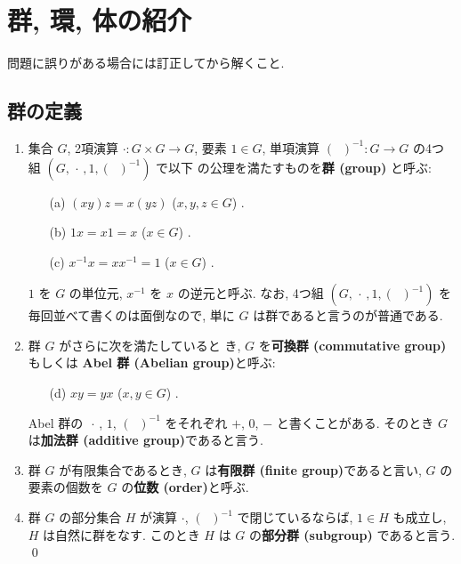 \documentclass[12pt,twoside]{jarticle}
\begin{document}

\section{群, 環, 体の紹介}

問題に誤りがある場合には訂正してから解くこと.


\subsection{群の定義}
\label{ss:group-def}

\begin{definition}[群]
\quad
\begin{enumerate}
\item 
  集合 $G$, 2項演算 $\cdot:G\times G\to G$, 要素 $1\in G$, 
  単項演算 $(\;\;)^{-1}:G\to G$ の4つ組 $(G,\,\cdot\,,1,(\;\;)^{-1})$ で以下
  の公理を満たすものを{\bf 群 (group)} と呼ぶ:
  \begin{enumerate}
  \item[(a)] $(xy)z = x(yz)$ \quad ($x,y,z\in G$)     .
  \item[(b)] $1x = x1 = x$ \quad ($x\in G$)           .
  \item[(c)] $x^{-1}x = xx^{-1} = 1$ \quad ($x\in G$) .
  \end{enumerate}
  $1$ を $G$ の単位元, $x^{-1}$ を $x$ の逆元と呼ぶ. 
  なお, 4つ組 $(G,\,\cdot\,,1,(\;\;)^{-1})$ を毎回並べて書くのは面倒なので, %
  単に $G$ は群であると言うのが普通である. 
\item
  群 $G$ がさらに次を満たしていると
  き, $G$ を{\bf 可換群 (commutative group)}
  もしくは {\bf Abel 群 (Abelian group)}と呼ぶ:
  \begin{enumerate}
  \item[(d)] $xy = yx$ \quad ($x,y\in G$) .
  \end{enumerate}
  Abel 群の $\,\cdot\,$, $1$, $(\;\;)^{-1}$ をそれぞれ %
  $+$, $0$, $-$ と書くことがある. 
  そのとき $G$ は{\bf 加法群 (additive group)}であると言う.
\item
  群 $G$ が有限集合であるとき, $G$ は{\bf 有限群 (finite group)}であると言い, 
  $G$ の要素の個数を $G$ の{\bf 位数 (order)}と呼ぶ.
\item
  群 $G$ の部分集合 $H$ が演算 $\cdot$, $(\;\;)^{-1}$ で閉じているならば, 
  $1\in H$ も成立し, $H$ は自然に群をなす.
  このとき $H$ は $G$ の{\bf 部分群 (subgroup)} であると言う.
  \qed
\end{enumerate}
\end{definition}
\end{document}
